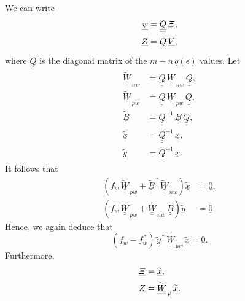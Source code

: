 \documentclass[12pt,prb,aps,notitlepage]{revtex4-1}
\begin{document}
We can write
\begin{align}
\underline{\psi} &= \underline{\underline{Q}}\,\underline{\mit\Xi},\\[0.5ex]
\underline{Z} &= \underline{\underline{Q}}\,\underline{V},
\end{align}
where $\underline{\underline{Q}}$ is the diagonal matrix of the $m-n\,q(\epsilon)$ values. 
Let
\begin{align}
\underline{\underline{\widetilde{W}}}_{\,nw} &= \underline{\underline{Q}}\,\underline{\underline{W}}_{\,nw}\,\underline{\underline{Q}},\\[0.5ex]
\underline{\underline{\widetilde{W}}}_{\,pw} &= \underline{\underline{Q}}\,\underline{\underline{W}}_{\,pw}\,\underline{\underline{Q}},\\[0.5ex]
\underline{\underline{\widetilde{B}}} &= \underline{\underline{Q}}^{-1}\,\underline{\underline{B}}\,\underline{\underline{Q}},\\[0.5ex]
\underline{\widetilde{x}}&=  \underline{\underline{Q}}^{-1}\,\underline{x},\\[0.5ex]
\underline{\widetilde{y}}&=  \underline{\underline{Q}}^{-1}\,\underline{x}.
\end{align}
It follows that 
\begin{align}
\left(f_w\,\underline{\underline{\widetilde{W}}}_{\,pw}
+\underline{\underline{\widetilde{B}}}^{\,\dag}\,\underline{\underline{\widetilde{W}}}_{\,nw}\right)\underline{\widetilde{x}}&=\underline{0},\\[0.5ex]
\left(f_w\,\underline{\underline{\widetilde{W}}}_{\,pw}
+\underline{\underline{\widetilde{W}}}_{\,nw}\,\underline{\underline{\widetilde{B}}}\right)\underline{\widetilde{y}} &=\underline{0}.\label{e142}
\end{align}
Hence, we again deduce that 
\begin{equation}
(f_w-f_w^{\,\ast})\,\underline{\widetilde{y}}^{\,\dag}\,\underline{\underline{\widetilde{W}}}_{\,pw}\,\underline{\widetilde{x}} = 0.
\end{equation}
Furthermore,
\begin{align}
\underline{\mit\Xi} &=\underline{\widetilde{x}},\\[0.5ex]
\underline{Z} &= \underline{\underline{\widetilde{W}}}_{\,p} \,\underline{\widetilde{x}}.
\end{align}
\end{document}
